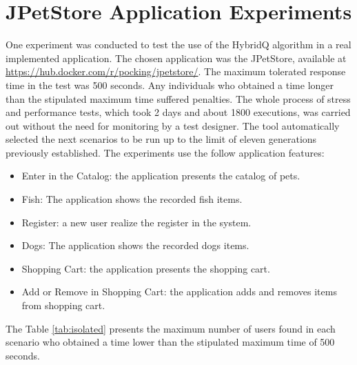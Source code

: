 
\section{JPetStore Application Experiments}

One experiment was conducted to test the use of the HybridQ algorithm in a real implemented application. The chosen application was the JPetStore, available at \url{https://hub.docker.com/r/pocking/jpetstore/}. The maximum tolerated response time in the test was 500 seconds.  Any  individuals who obtained a time longer than the stipulated maximum time suffered penalties.  The whole process of stress and performance tests, which took 2 days and about 1800 executions, was carried out without the need for monitoring by a test designer. The tool automatically selected the next scenarios to be run up to the limit of eleven generations previously established. The experiments use the follow application features:


\begin{itemize}
\item Enter in the Catalog: the application presents the catalog of pets.
\item Fish: The application shows the recorded fish items.
\item Register:  a new user realize the register in the system.
\item Dogs: The application shows the recorded dogs items.
\item Shopping Cart: the application presents the shopping cart.
\item Add or Remove in Shopping Cart: the application adds and removes items from shopping cart.
\end{itemize}

The Table \ref{tab:isolated} presents the maximum number of users found in each scenario who obtained a time lower than the stipulated maximum time of 500 seconds.


